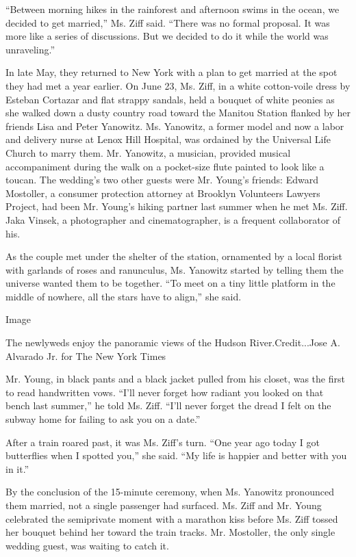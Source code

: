 ``Between morning hikes in the rainforest and afternoon swims in the
ocean, we decided to get married,'' Ms. Ziff said. ``There was no formal
proposal. It was more like a series of discussions. But we decided to do
it while the world was unraveling.''

In late May, they returned to New York with a plan to get married at the
spot they had met a year earlier. On June 23, Ms. Ziff, in a white
cotton-voile dress by Esteban Cortazar and flat strappy sandals, held a
bouquet of white peonies as she walked down a dusty country road toward
the Manitou Station flanked by her friends Lisa and Peter Yanowitz. Ms.
Yanowitz, a former model and now a labor and delivery nurse at Lenox
Hill Hospital, was ordained by the Universal Life Church to marry them.
Mr. Yanowitz, a musician, provided musical accompaniment during the walk
on a pocket-size flute painted to look like a toucan. The wedding's two
other guests were Mr. Young's friends: Edward Mostoller, a consumer
protection attorney at Brooklyn Volunteers Lawyers Project, had been Mr.
Young's hiking partner last summer when he met Ms. Ziff. Jaka Vinsek, a
photographer and cinematographer, is a frequent collaborator of his.

As the couple met under the shelter of the station, ornamented by a
local florist with garlands of roses and ranunculus, Ms. Yanowitz
started by telling them the universe wanted them to be together. ``To
meet on a tiny little platform in the middle of nowhere, all the stars
have to align,'' she said.

Image

The newlyweds enjoy the panoramic views of the Hudson
River.Credit...Jose A. Alvarado Jr. for The New York Times

Mr. Young, in black pants and a black jacket pulled from his closet, was
the first to read handwritten vows. ``I'll never forget how radiant you
looked on that bench last summer,'' he told Ms. Ziff. ``I'll never
forget the dread I felt on the subway home for failing to ask you on a
date.''

After a train roared past, it was Ms. Ziff's turn. ``One year ago today
I got butterflies when I spotted you,'' she said. ``My life is happier
and better with you in it.''

By the conclusion of the 15-minute ceremony, when Ms. Yanowitz
pronounced them married, not a single passenger had surfaced. Ms. Ziff
and Mr. Young celebrated the semiprivate moment with a marathon kiss
before Ms. Ziff tossed her bouquet behind her toward the train tracks.
Mr. Mostoller, the only single wedding guest, was waiting to catch it.

